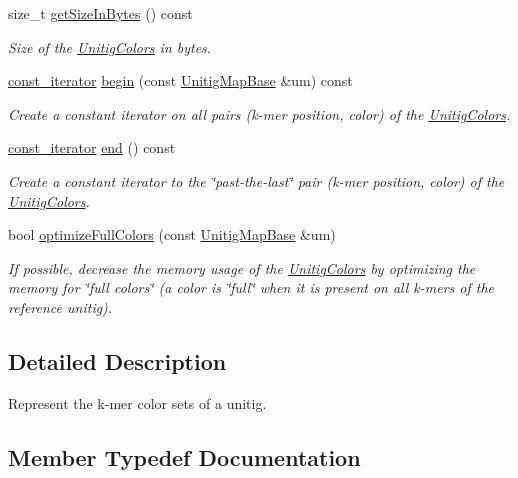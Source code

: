 \begin{DoxyCompactItemize}
size\+\_\+t \hyperlink{classUnitigColors_af44f80476c0d1764a8b1c5530cf8f42e}{get\+Size\+In\+Bytes} () const
\begin{DoxyCompactList}\small\item\em Size of the \hyperlink{classUnitigColors}{Unitig\+Colors} in bytes. \end{DoxyCompactList}\item 
\hyperlink{classUnitigColors_ad4d35f8af18dfd9cad99e92ca2328fee}{const\+\_\+iterator} \hyperlink{classUnitigColors_a16c8dcb7d6e1f900cf6a52504896b241}{begin} (const \hyperlink{structUnitigMapBase}{Unitig\+Map\+Base} \&um) const
\begin{DoxyCompactList}\small\item\em Create a constant iterator on all pairs (k-\/mer position, color) of the \hyperlink{classUnitigColors}{Unitig\+Colors}. \end{DoxyCompactList}\item 
\hyperlink{classUnitigColors_ad4d35f8af18dfd9cad99e92ca2328fee}{const\+\_\+iterator} \hyperlink{classUnitigColors_adf18eea48391e100c5167405a9679b35}{end} () const
\begin{DoxyCompactList}\small\item\em Create a constant iterator to the \char`\"{}past-\/the-\/last\char`\"{} pair (k-\/mer position, color) of the \hyperlink{classUnitigColors}{Unitig\+Colors}. \end{DoxyCompactList}\item 
bool \hyperlink{classUnitigColors_a032cc5da8535232251e1c44c9a8d0258}{optimize\+Full\+Colors} (const \hyperlink{structUnitigMapBase}{Unitig\+Map\+Base} \&um)
\begin{DoxyCompactList}\small\item\em If possible, decrease the memory usage of the \hyperlink{classUnitigColors}{Unitig\+Colors} by optimizing the memory for \char`\"{}full
colors\char`\"{} (a color is \char`\"{}full\char`\"{} when it is present on all k-\/mers of the reference unitig). \end{DoxyCompactList}\end{DoxyCompactItemize}


\subsection{Detailed Description}
Represent the k-\/mer color sets of a unitig. 

\subsection{Member Typedef Documentation}
\mbox{\label{classUnitigColors_ad4d35f8af18dfd9cad99e92ca2328fee}} 
